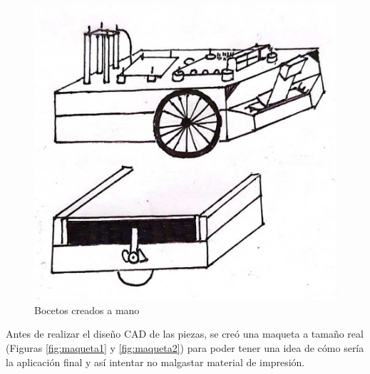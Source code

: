\begin{figure}[ht!]
\begin{minipage}{0.4\linewidth}
	\end{minipage}
	\hspace{2cm}
	\begin{minipage}{0.5\linewidth}
		\centering
		\includegraphics[width=\linewidth]{figs/cap5/boceto_papel.jpeg}
	\end{minipage}
	\caption{Bocetos creados a mano}
	\label{fig:bocetos}
\end{figure}

Antes de realizar el diseño \acs{CAD} de las piezas, se creó una maqueta a tamaño real (Figuras \ref{fig:maqueta1} y \ref{fig:maqueta2}) para poder tener una idea de cómo sería la aplicación final y así intentar no malgastar material de impresión. 

